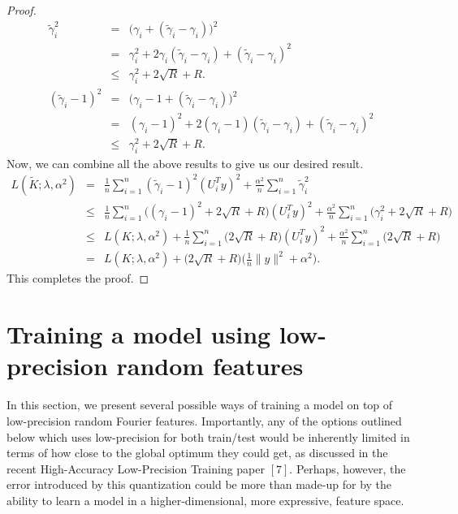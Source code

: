 \documentclass[12pt]{article}
\newcommand{\tK}{\tilde{K}}
\newcommand{\tgamma}{\tilde{\gamma}}
\begin{document}
\begin{proof}
\begin{eqnarray*}
	\tgamma_i^2 &=& \big(\gamma_i +(\tgamma_i - \gamma_i)\big)^2 \\
	&=& \gamma_i^2 + 2\gamma_i(\tgamma_i - \gamma_i) + (\tgamma_i - \gamma_i)^2 \\
	&\leq& \gamma_i^2 + 2\sqrt{R}+R.\\
	(\tgamma_i-1)^2 &=& \big(\gamma_i-1 +(\tgamma_i - \gamma_i)\big)^2 \\
	&=& (\gamma_i-1)^2 + 2(\gamma_i-1)(\tgamma_i - \gamma_i) + (\tgamma_i - \gamma_i)^2 \\
	&\leq& \gamma_i^2 + 2\sqrt{R}+R.
\end{eqnarray*}
Now, we can combine all the above results to give us our desired result.
\begin{eqnarray*}
	L(\tK; \lambda, \alpha^2) &=& \frac{1}{n}\sum_{i=1}^n(\tgamma_i-1)^2 (U_i^Ty)^2 + \frac{\alpha^2}{n}\sum_{i=1}^n \tgamma_i^2 \\
	&\leq& \frac{1}{n}\sum_{i=1}^n\bigg((\gamma_i-1)^2 + 2\sqrt{R} + R\bigg) (U_i^Ty)^2 + \frac{\alpha^2}{n}\sum_{i=1}^n \bigg(\gamma_i^2 + 2\sqrt{R} + R\bigg) \\
	&\leq& L(K; \lambda, \alpha^2) + \frac{1}{n}\sum_{i=1}^n\bigg(2\sqrt{R} + R\bigg) (U_i^Ty)^2 + \frac{\alpha^2}{n}\sum_{i=1}^n \bigg(2\sqrt{R} + R\bigg) \\
	&=& L(K; \lambda, \alpha^2) + \bigg(2\sqrt{R} + R\bigg)\bigg(\frac{1}{n}\|y\|^2 + \alpha^2 \bigg).
\end{eqnarray*}
This completes the proof.
\end{proof}


\section{Training a model using low-precision random features}
\label{sec:train}
In this section, we present several possible ways of training a model on top of low-precision random Fourier features.  Importantly, any of the options outlined below which uses low-precision for both train/test would be inherently limited in terms of how close to the global optimum they could get, as discussed in the recent High-Accuracy Low-Precision Training paper $[7]$.  Perhaps, however, the error introduced by this quantization could be more than made-up for by the ability to learn a model in a higher-dimensional, more expressive, feature space.
\end{document}
